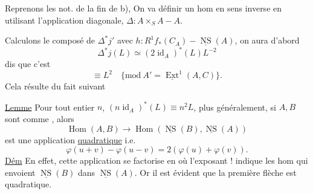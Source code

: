 
Reprenons les not.  de la fin de b), On va définir un hom en sens inverse
en utilisant l'application diagonale, $\Delta:A\times_S A\mathbin{-}A$.

Calculons  le composé  de $\Delta^*j'$ avec $h:R^1f_*(C_A)\mathbin{-}\underline{\operatorname{NS}}(A)$, on aura d'abord
\[
\Delta^*j(L)\simeq(2\operatorname{id}_A)^*(L)L^{-2}
\]
 dis que c'est
\[
\equiv L^2\quad\{\mathrm{mod}\ A'=\underline{\operatorname{Ext}}^1(A,C)\}.
\]
Cela résulte du fait suivant

\uline{Lemme} Pour tout entier $n$, $(n\operatorname{id}_A)^*(L)\equiv n^2L$,
 plus généralement, si $A,B$ sont comme , alors
\[
\operatorname{Hom}(A,B)\longrightarrow\operatorname{Hom}(\underline{\operatorname{NS}}(B),\underline{\operatorname{NS}}(A))
\]
est une application \uline{quadratique} i.e.
\[
\varphi(u+v)-\varphi(u-v)=2(\varphi(u)+\varphi(v)).
\]
 \uline{Dém} En effet, cette application se factorise en
où l'exposant ! indique les hom qui envoient $\underline{\operatorname{NS}}(B)$ dans $\underline{\operatorname{NS}}(A)$.  Or il est évident que la première flèche est quadratique.

